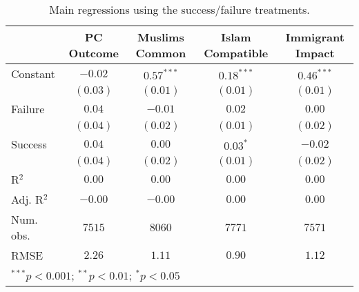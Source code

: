 
\begin{table}[H]
\begin{center}
\begin{footnotesize}
\begin{tabular}{l c c c c}
\hline
 & PC Outcome & Muslims Common & Islam Compatible & Immigrant Impact \\
\hline
Constant   & $-0.02$  & $0.57^{***}$ & $0.18^{***}$ & $0.46^{***}$ \\
           & $(0.03)$ & $(0.01)$     & $(0.01)$     & $(0.01)$     \\
Failure    & $0.04$   & $-0.01$      & $0.02$       & $0.00$       \\
           & $(0.04)$ & $(0.02)$     & $(0.01)$     & $(0.02)$     \\
Success    & $0.04$   & $0.00$       & $0.03^{*}$   & $-0.02$      \\
           & $(0.04)$ & $(0.02)$     & $(0.01)$     & $(0.02)$     \\
\hline
R$^2$      & $0.00$   & $0.00$       & $0.00$       & $0.00$       \\
Adj. R$^2$ & $-0.00$  & $-0.00$      & $0.00$       & $0.00$       \\
Num. obs.  & $7515$   & $8060$       & $7771$       & $7571$       \\
RMSE       & $2.26$   & $1.11$       & $0.90$       & $1.12$       \\
\hline
\multicolumn{5}{l}{\tiny{$^{***}p<0.001$; $^{**}p<0.01$; $^{*}p<0.05$}}
\end{tabular}
\end{footnotesize}
\caption{Main regressions using the success/failure treatments.}
\label{tab:success_main}
\end{center}
\end{table}
